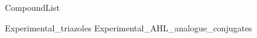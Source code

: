 \documentclass[10pt,a4paper]{article}
\begin{document}
	

{CompoundList}

\tableofcontents




{Experimental_triazoles}
{Experimental_AHL_analogue_conjugates}

%
\end{document}
